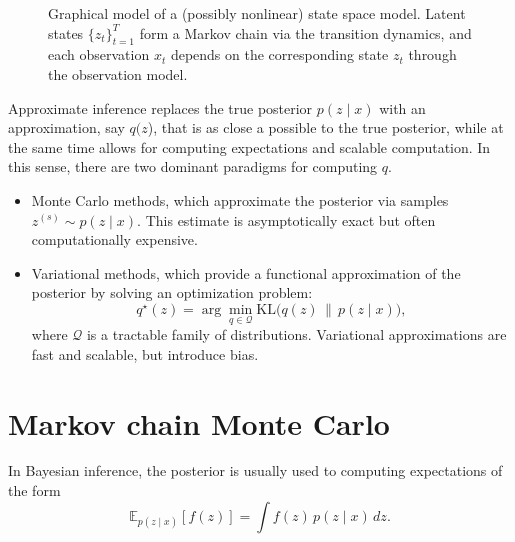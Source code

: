 \begin{example}
\begin{figure}[t]
\caption{Graphical model of a (possibly nonlinear) state space model. Latent states
$\{z_t\}_{t=1}^T$ form a Markov chain via the transition dynamics, and each observation
$x_t$ depends on the corresponding state $z_t$ through the observation model.}
\label{fig:ssm_graphical_model}
\end{figure}


\end{example}



Approximate inference replaces the true posterior $p(z \mid x)$ with an approximation, say $q(z$), that is as close a possible to the true posterior, while at the same time allows for computing expectations and scalable computation. In this sense, there are two dominant paradigms for computing $q$. 

\begin{itemize}
    \item Monte Carlo methods, which approximate the posterior via samples $z^{(s)} \sim p(z\mid x)$. This estimate is asymptotically exact but often computationally expensive.
    \item Variational methods, which provide a functional approximation of the posterior by solving an optimization problem:
    \[
q^\star(z)
=
\arg\min_{q \in \mathcal Q}
\mathrm{KL}\big(q(z)\,\|\,p(z\mid x)\big),
\]
where \(\mathcal Q\) is a tractable family of distributions. Variational approximations are fast and scalable, but introduce bias.
\end{itemize}


\section{Markov chain Monte Carlo}

In Bayesian inference, the posterior is usually used to computing expectations of the form
\[
\mathbb E_{p(z\mid x)}[f(z)] = \int f(z)\,p(z\mid x)\,dz.
\]

